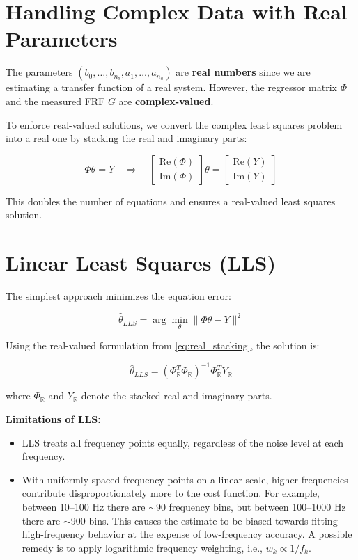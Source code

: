 \section{Handling Complex Data with Real Parameters}

The parameters $(b_0, \ldots, b_{n_b}, a_1, \ldots, a_{n_a})$ are \textbf{real numbers} since we are estimating a transfer function of a real system. However, the regressor matrix $\Phi$ and the measured FRF $G$ are \textbf{complex-valued}.

To enforce real-valued solutions, we convert the complex least squares problem into a real one by stacking the real and imaginary parts:

\begin{equation}
    \Phi \theta = Y \quad \Rightarrow \quad 
    \begin{bmatrix} \text{Re}(\Phi) \\ \text{Im}(\Phi) \end{bmatrix} \theta = 
    \begin{bmatrix} \text{Re}(Y) \\ \text{Im}(Y) \end{bmatrix}
    \label{eq:real_stacking}
\end{equation}

This doubles the number of equations and ensures a real-valued least squares solution.

\section{Linear Least Squares (LLS)}

The simplest approach minimizes the equation error:

\begin{equation}
    \hat{\theta}_{LLS} = \arg\min_\theta \| \Phi \theta - Y \|^2
\end{equation}

Using the real-valued formulation from \eqref{eq:real_stacking}, the solution is:

\begin{equation}
    \hat{\theta}_{LLS} = \left( \Phi_\mathbb{R}^T \Phi_\mathbb{R} \right)^{-1} \Phi_\mathbb{R}^T Y_\mathbb{R}
\end{equation}

where $\Phi_\mathbb{R}$ and $Y_\mathbb{R}$ denote the stacked real and imaginary parts.

\textbf{Limitations of LLS:}
\begin{itemize}
    \item LLS treats all frequency points equally, regardless of the noise level at each frequency.
    \item With uniformly spaced frequency points on a linear scale, higher frequencies contribute disproportionately more to the cost function. For example, between 10--100 Hz there are $\sim$90 frequency bins, but between 100--1000 Hz there are $\sim$900 bins. This causes the estimate to be biased towards fitting high-frequency behavior at the expense of low-frequency accuracy. A possible remedy is to apply logarithmic frequency weighting, i.e., $w_k \propto 1/f_k$.
\end{itemize}

